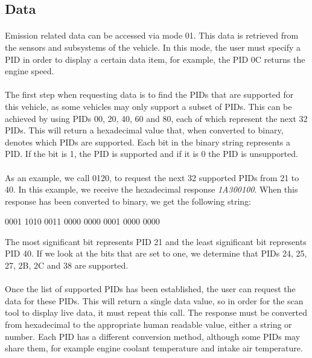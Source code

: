 	\subsection{Data}{
		\paragraph{}{
		Emission related data can be accessed via mode 01. This data is retrieved from the sensors and subsystems of the vehicle. In this mode, the user must specify a PID in order to display a certain data item, for example, the PID 0C returns the engine speed.
		}
		\paragraph{}{
		The first step when requesting data is to find the PIDs that are supported for this vehicle, as some vehicles may only support a subset of PIDs. This can be achieved by using PIDs 00, 20, 40, 60 and 80, each of which represent the next 32 PIDs. This will return a hexadecimal value that, when converted to binary, denotes which PIDs are supported. Each bit in the binary string represents a PID. If the bit is 1, the PID is supported and if it is 0 the PID is unsupported.
						
		}
		\paragraph{}{
		As an example, we call 0120, to request the next 32 supported PIDs from 21 to 40. In this example, we receive the hexadecimal response \textit{1A300100}. When this response has been converted to binary, we get the following string:
		\begin{center}
			0001 1010 0011 0000 0000 0001 0000 0000\\
		\end{center}
		The most significant bit represents PID 21 and the least significant bit represents PID 40. If we look at the bits that are set to one, we determine that PIDs 24, 25, 27, 2B, 2C and 38 are supported.
		}
		\paragraph{}{
		Once the list of supported PIDs has been established, the user can request the data for these PIDs. This will return a single data value, so in order for the scan tool to display live data, it must repeat this call. The response must be converted from hexadecimal to the appropriate human readable value, either a string or number. Each PID has a different conversion method, although some PIDs may share them, for example engine coolant temperature and intake air temperature.
		}
	}
	\label{ssec:Data}
		
